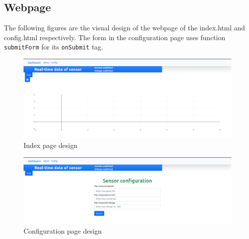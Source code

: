 \documentclass[../main.tex]{subfiles}
\begin{document}
    \subsection{Webpage}
    \justify
    The following figures are the visual design of the webpage of the index.html and config.html respectively. The form in the configuration page uses function \lstinline[language=JavaScript]{submitForm} for its \lstinline[language=HTML]{onSubmit} tag.
    \begin{figure}[!h]
        \centerline{\includegraphics[width=\linewidth]{media/index_html.png}}
        \caption{Index page design}
        \label{fig:index_html}
    \end{figure}
    \begin{figure}[!h]
        \centerline{\includegraphics[width=\linewidth]{media/config_html.png}}
        \caption{Configuration page design}
        \label{fig:config_html}
    \end{figure}
\end{document}
